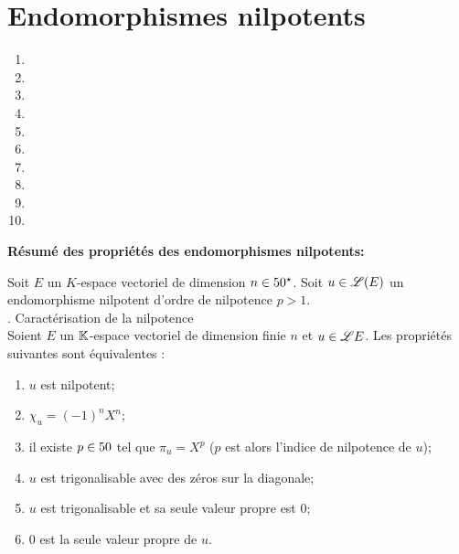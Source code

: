 \documentclass[
	a4paper, %
	fontsize=11pt, %
	twoside=true, %
	chapterentrydots=true, %
	numbers=noenddot, %
]{kaobook}
\begin{document}
\section{Endomorphismes nilpotents}
\begin{enumerate}
    \item {}
    \item {}
    \item {}
    \item {}
    \item {}
    \item {}
    \item {}
    \item {}
    \item {}
    \item {}
\end{enumerate}

\textbf{Résumé des propriétés des endomorphismes nilpotents:}

Soit $E$ un $K$-espace vectoriel de dimension $n \in 50^\star$. Soit $u \in \mathscr{L}(E)$ un endomorphisme nilpotent d'ordre de nilpotence $p > 1$. \\
\cite{objectif_agregation}. Caractérisation de la nilpotence \\
Soient $E$ un $\mathbb{K}$-espace vectoriel de dimension finie $n$ et $u \in \mathscr{L}{E}$. Les propriétés suivantes sont équivalentes :
\begin{enumerate}[label=(\roman*)]
    \item $u$ est nilpotent;
    \item $\chi_u = (-1)^n X^n$;
    \item il existe $p \in 50$ tel que $\pi_u = X^p$ ($p$ est alors l'indice de nilpotence de $u$);
    \item $u$ est trigonalisable avec des zéros sur la diagonale;
    \item $u$ est trigonalisable et sa seule valeur propre est $0$;
    \item $0$ est la seule valeur propre de $u$.
\end{enumerate}
\end{document}
